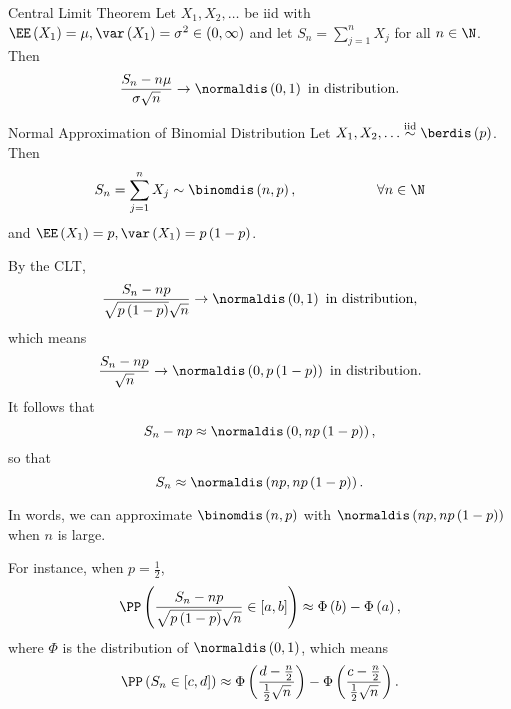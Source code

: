 \documentclass[stat901]{subfiles}
\begin{document}
    \begin{theorem}{Central Limit Theorem}
        Let $X_1,X_2,\ldots$ be iid with $\EE\left( X_1 \right) = \mu, \var\left( X_1 \right) = \sigma^{2}\in\left( 0,\infty \right)$ and let $S_n = \sum^{n}_{j=1}X_j$ for all $n\in\N$. Then
        \begin{equation*}
            \frac{S_n-n\mu}{\sigma\sqrt{n}} \to \normaldis\left( 0,1 \right) \text{ in distribution}.
        \end{equation*}
    \end{theorem}

    \rruleline
    
    \begin{example}{Normal Approximation of Binomial Distribution}
        Let $X_1,X_2,\ldots\overset{\text{iid}}{\sim}\berdis\left( p \right)$. Then
        \begin{equation*}
            S_n = \sum^{n}_{j=1} X_j \sim\binomdis\left( n,p \right), \hspace{2cm}\forall n\in\N
        \end{equation*}
        and $\EE\left( X_1 \right) = p, \var\left( X_1 \right) = p\left( 1-p \right)$.

        By the CLT,
        \begin{equation*}
            \frac{S_n-np}{\sqrt{p\left( 1-p \right)}\sqrt{n}} \to \normaldis\left( 0,1 \right) \text{ in distribution},
        \end{equation*}
        which means
        \begin{equation*}
            \frac{S_n-np}{\sqrt{n}} \to \normaldis\left( 0,p\left( 1-p \right) \right) \text{ in distribution}.
        \end{equation*}
        It follows that
        \begin{equation*}
            S_n-np \approx \normaldis\left( 0,np\left( 1-p \right) \right),
        \end{equation*}
        so that
        \begin{equation*}
            S_n\approx\normaldis\left( np,np\left( 1-p \right) \right).
        \end{equation*}

        In words, we can approximate $\binomdis\left( n,p \right)$ with $\normaldis\left( np,np\left( 1-p \right) \right)$ when $n$ is large.

        For instance, when $p=\frac{1}{2}$,
        \begin{equation*}
            \PP\left( \frac{S_n-np}{\sqrt{p\left( 1-p \right)}\sqrt{n}} \in \left[ a,b \right] \right) \approx \Phi\left( b \right) - \Phi\left( a \right),
        \end{equation*}
        where $\Phi$ is the distribution of $\normaldis\left( 0,1 \right)$, which means
        \begin{equation*}
            \PP\left( S_n\in\left[ c,d \right] \right) \approx \Phi\left( \frac{d-\frac{n}{2}}{\frac{1}{2}\sqrt{n}} \right) - \Phi\left( \frac{c-\frac{n}{2}}{\frac{1}{2}\sqrt{n}} \right).
        \end{equation*}
    \end{example}
    
\end{document}
